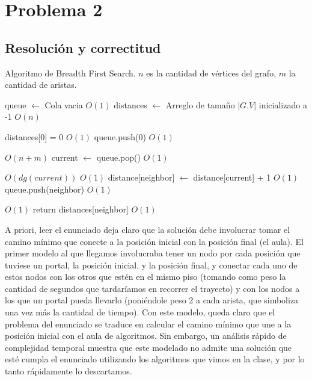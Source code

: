 \documentclass{article}
\theoremstyle{definition}
\theoremstyle{remark}
\begin{document}
\vspace{2cm}
\pagebreak
\newpage

\section{Problema 2}
\subsection{Resolución y correctitud}

\begin{algorithm}[h!]
\caption{Algoritmo de Breadth First Search. $n$ es la cantidad de vértices del grafo, $m$ la cantidad de aristas. \label{alg:bfs}}

\begin{algorithmic}[h!]
\State queue $\gets$ Cola vacia \Comment $O(1)$
\State distances $\gets$ Arreglo de tamaño $|G.V|$ inicializado a -1 \Comment $O(n)$

\State distances[0] = 0 \Comment $O(1)$
\State queue.push(0) \Comment $O(1)$

 \Comment $O(n + m)$
    \State current $\gets$ queue.pop() \Comment $O(1)$
    
     \Comment $O(dg(current))$
         \Comment $O(1)$
            \State distance[neighbor] $\gets$ distance[current] + 1 \Comment $O(1)$
            \State queue.push(neighbor) \Comment $O(1)$
        \EndIf
        
         \Comment $O(1)$
            \State return distances[neighbor] \Comment $O(1)$
        \EndIf
    \EndFor
\EndWhile
\EndProcedure
\end{algorithmic}
\end{algorithm}

\vspace{10em}
A priori, leer el enunciado deja claro que la solución debe involucrar tomar el camino mínimo que conecte a la posición inicial con la posición final (el aula). El primer modelo al que llegamos involucraba tener un nodo por cada posición que tuviese un portal, la posición inicial, y la posición final, y conectar cada uno de estos nodos con los otros que estén en el mismo piso (tomando como peso la cantidad de segundos que tardaríamos en recorrer el trayecto) y con los nodos a los que un portal pueda llevarlo (poniéndole peso 2 a cada arista, que simboliza una vez más la cantidad de tiempo). Con este modelo, queda claro que el problema del enunciado se traduce en calcular el camino mínimo que une a la posición inicial con el aula de algoritmos. Sin embargo, un análisis rápido de complejidad temporal muestra que este modelado no admite una solución que esté cumpla el enunciado utilizando los algoritmos que vimos en la clase, y por lo tanto rápidamente lo descartamos.
\end{document}

